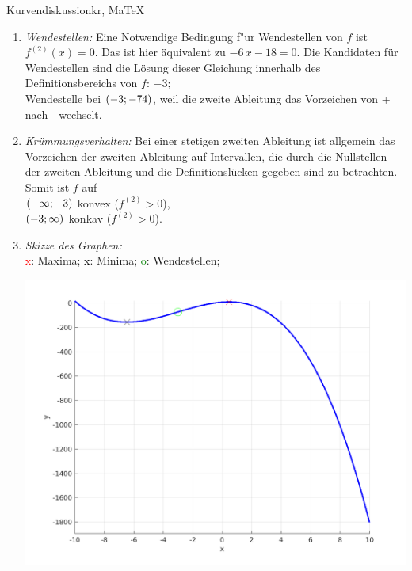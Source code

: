 \begin{MAufgabe}{Kurvendiskussion}{kr, MaTeX}
\begin{enumerate}
 Bei einer stetigen ersten Ableitung ist allgemein das Vorzeichen der ersten Ableitung auf Intervallen, die durch die Extremstellen und die Definitionsl\"ucken gegeben sind zu betrachten. Somit ist $f$ auf \\ 
 $\MoIl-\infty\MIntvlSep - 2\, \sqrt{3} - 3\MoIr$ monoton fallend, \\ 
 $\MoIl - 2\, \sqrt{3} - 3\MIntvlSep2\, \sqrt{3} - 3\MoIr$ monoton  wachsend, \\ 
 $\MoIl2\, \sqrt{3} - 3\MIntvlSep \infty\MoIr$ monoton fallend. \\ 
 \item \emph{Wendestellen:} 
 Eine Notwendige Bedingung f"ur Wendestellen von $f$ ist $f^{(2)}(x)=0$. 
 Das ist hier \"aquivalent zu $ - 6\, x - 18=0$. 
 Die Kandidaten f\"ur Wendestellen sind die L\"osung dieser Gleichung innerhalb des Definitionsbereichs von $f$: $-3$; \\ 
 Wendestelle bei $(-3;-74)$, weil die zweite Ableitung das Vorzeichen von + nach - wechselt. \\ 
 \item \emph{Kr\"ummungsverhalten:} 
 Bei einer stetigen zweiten Ableitung ist allgemein das Vorzeichen der zweiten Ableitung auf Intervallen, die durch die Nullstellen der zweiten Ableitung und die Definitionsl\"ucken gegeben sind zu betrachten. 
 Somit ist $f$ auf \\ 
 $(-\infty ;-3)$  konvex ($f^{(2)}>0$), \\ 
 $(-3; \infty)$  konkav ($f^{(2)}>0$). \\ 
 \item \emph{Skizze des Graphen:} \\ 
 {\textcolor{red} x}: Maxima; {\textcolor{black} x}: Minima; {\textcolor{green} o}: Wendestellen; 
  \begin{center}
  \includegraphics[width=0.8\linewidth]{Abb_zur_Ag_autogenerated_fractions_34.png} \end{center}
  
 \end{enumerate}
 \else\relax\fi
  \end{MAufgabe}